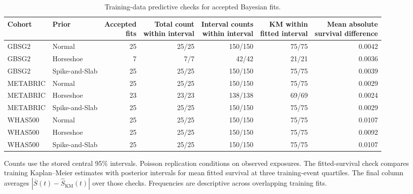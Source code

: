 \begin{table}[htbp]
\centering\footnotesize
\setlength{\tabcolsep}{4pt}
\caption{Training-data predictive checks for accepted Bayesian fits.}
\label{tab:sup-predictive-checks}
\begin{tabular}{@{}llrrrrr@{}}\toprule
Cohort & Prior & \shortstack{Accepted\\fits} & \shortstack{Total count\\within interval} & \shortstack{Interval counts\\within interval} & \shortstack{KM within\\fitted interval} & \shortstack{Mean absolute\\survival difference}\\\midrule
GBSG2 & Normal & 25 & 25/25 & 150/150 & 75/75 & 0.0042 \\
GBSG2 & Horseshoe & 7 & 7/7 & 42/42 & 21/21 & 0.0036 \\
GBSG2 & Spike-and-Slab & 25 & 25/25 & 150/150 & 75/75 & 0.0039 \\
METABRIC & Normal & 25 & 25/25 & 150/150 & 75/75 & 0.0029 \\
METABRIC & Horseshoe & 23 & 23/23 & 138/138 & 69/69 & 0.0024 \\
METABRIC & Spike-and-Slab & 25 & 25/25 & 150/150 & 75/75 & 0.0029 \\
WHAS500 & Normal & 25 & 25/25 & 150/150 & 75/75 & 0.0107 \\
WHAS500 & Horseshoe & 25 & 25/25 & 150/150 & 75/75 & 0.0092 \\
WHAS500 & Spike-and-Slab & 25 & 25/25 & 150/150 & 75/75 & 0.0107 \\
\bottomrule\end{tabular}
\par\smallskip\begin{minipage}{\linewidth}\footnotesize Counts use the stored central 95\% intervals. Poisson replication conditions on observed exposures. The fitted-survival check compares training Kaplan--Meier estimates with posterior intervals for mean fitted survival at three training-event quartiles. The final column averages $|\overline S(t)-\widehat S_{\mathrm{KM}}(t)|$ over those checks. Frequencies are descriptive across overlapping training fits.\end{minipage}
\end{table}

